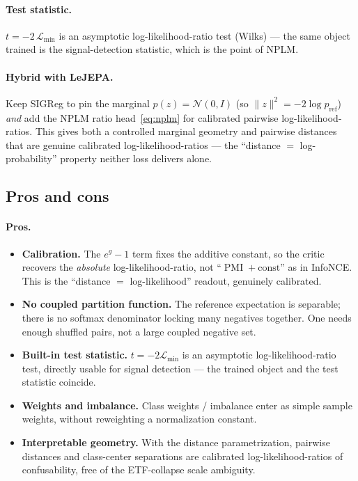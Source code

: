 \documentclass[11pt]{article}
\begin{document}
\paragraph{Test statistic.} $t=-2\,\mathcal{L}_{\min}$ is an asymptotic
log-likelihood-ratio test (Wilks) --- the same object trained is the
signal-detection statistic, which is the point of NPLM.

\paragraph{Hybrid with LeJEPA.} Keep SIGReg to pin the marginal
$p(z)=\mathcal{N}(0,I)$ (so $\|z\|^2=-2\log p_{\mathrm{ref}}$) \emph{and} add the
NPLM ratio head~\eqref{eq:nplm} for calibrated pairwise log-likelihood-ratios.
This gives both a controlled marginal geometry and pairwise distances that are
genuine calibrated log-likelihood-ratios --- the ``distance $=$ log-probability''
property neither loss delivers alone.

\subsection{Pros and cons}
\paragraph{Pros.}
\begin{itemize}
\item \textbf{Calibration.} The $e^{g}-1$ term fixes the additive constant, so
the critic recovers the \emph{absolute} log-likelihood-ratio, not
``$\operatorname{PMI}+\text{const}$'' as in InfoNCE. This is the ``distance $=$
log-likelihood'' readout, genuinely calibrated.
\item \textbf{No coupled partition function.} The reference expectation is
separable; there is no softmax denominator locking many negatives together. One
needs enough shuffled pairs, not a large coupled negative set.
\item \textbf{Built-in test statistic.} $t=-2\mathcal{L}_{\min}$ is an asymptotic
log-likelihood-ratio test, directly usable for signal detection --- the trained
object and the test statistic coincide.
\item \textbf{Weights and imbalance.} Class weights / imbalance enter as simple
sample weights, without reweighting a normalization constant.
\item \textbf{Interpretable geometry.} With the distance parametrization, pairwise
distances and class-center separations are calibrated log-likelihood-ratios of
confusability, free of the ETF-collapse scale ambiguity.
\end{itemize}
\end{document}
